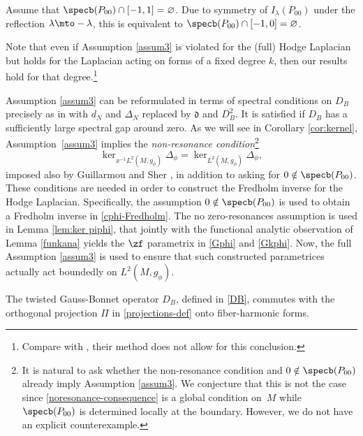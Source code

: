 \begin{assum}\label{assum3}
Assume that $\specb(P_{00}) \cap[-1,1]=\varnothing$.
Due to symmetry of $I_\lambda(P_{00})$ under the reflection
$\lambda \mto - \lambda$, this is equivalent to $\specb(P_{00}) \cap[-1,0]=\varnothing$.
\end{assum}

Note that even if Assumption \ref{assum3} is violated for the (full) Hodge Laplacian but holds for
the Laplacian acting on forms of a fixed degree $k$, then our results hold for that degree.\footnote{Compare with \cite{kottke-rochon}, their method does not allow for this conclusion.}

Assumption \ref{assum3} can be reformulated in terms of spectral
conditions on $D_B$ precisely as in \cite[(21)]{guillarmou2014low}
with $d_N$ and $\Delta_N$ replaced by $\mathfrak{d}$ and $D^2_B$. It is satisfied if $D_B$ has a sufficiently large spectral gap around zero.
As we will see in Corollary \ref{cor:kernel}, Assumption~\ref{assum3} implies the \textit{non-resonance condition}\footnote{It is natural to ask whether the non-resonance condition and $0 \notin \specb(P_{00})$ already imply Assumption \ref{assum3}. We conjecture that this is not the case since \eqref{noresonance-consequence} is a global condition on~$M$ while $\specb(P_{00})$ is determined locally at the boundary. However, we do not have an explicit counterexample.}
\begin{equation}\label{noresonance-consequence}
\ker_{x^{-1}L^{2}(M,g_\phi) }\Delta_{\phi} = \ker_{L^{2}(M,g_\phi)}\Delta_{\phi},
\end{equation}
imposed also by Guillarmou and Sher \cite{guillarmou2014low}, in addition to asking for
$0 \notin \specb(P_{00})$. These conditions are needed in order to construct the Fredholm
inverse for the Hodge Laplacian. Specifically, the assumption $0 \notin \specb(P_{00})$
is used to obtain a Fredholm inverse in \eqref{cphi-Fredholm}.
The no zero-resonances assumption is used in Lemma \ref{lem:ker piphi}, that jointly with the functional
analytic observation of Lemma \ref{funkana} yields the $\zf$ parametrix in \eqref{Gphi}
and \eqref{Gkphi}. Now, the full Assumption \ref{assum3} is used to ensure that
such constructed parametrices actually act boundedly on $L^2(M,g_\phi)$.

\begin{assum}\label{assum4}
The twisted Gauss-Bonnet operator $D_B$, defined in \eqref{DB}, commutes with the orthogonal
projection $\Pi$ in \eqref{projections-def} onto fiber-harmonic forms.
\end{assum}

